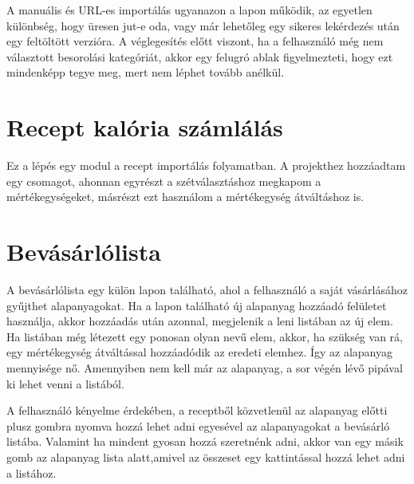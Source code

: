 \documentclass[12pt]{report}
\theoremstyle{definition}
\begin{document}
A manuális és URL-es importálás ugyanazon a lapon működik, az egyetlen különbség, hogy üresen jut-e oda, vagy már lehetőleg egy sikeres lekérdezés után egy feltöltött verzióra. A véglegesítés előtt viszont, ha a felhasználó még nem választott besorolási kategóriát, akkor egy felugró ablak figyelmezteti, hogy ezt mindenképp tegye meg, mert nem léphet tovább anélkül.

\section{Recept kalória számlálás}
Ez a lépés egy modul a recept importálás folyamatban. A projekthez hozzáadtam egy csomagot, ahonnan egyrészt a szétválasztáshoz megkapom a mértékegységeket, másrészt ezt használom a mértékegység átváltáshoz is.

	{\color{red}{
			A tápanyag információkat egy külső adatbázisból szedem, ami /*offline */ és a Food Data Central API ameriaki állami adatbázis rendszert használtam. A használati feltételeket végigolvasva kiderült, hogy bárki ingyen használhatja, akár a jogok feltüntetése nélkül is, bár megköszönik, amennyiben az megtörténne.
		}}

	{\color{red}{
			A kalóriaszámlálás kizárólag akkor fut le, ha a receptlekérdezés során nem létezett az eredeti oldalon a kalória információ, vagy ha a recept manuálisan lett létrehozva. Ahhoz, hogy megfelelő eredményt kapjunk, ha az alapanyagokból nem tudunk legalább 80 százalékból tápanyag adatot megkapni, akkor nem lesz megjelenítve kalória információ a recepthez. Amennyiben megfelelő mennyiségű adatunk van, a korábban említett mértékegység átváltásokkal egységesítem az alapanyagokat a tápanyag táblázat alap értékéhez, aztán azt összeadva kapjuk a kalória adatot a recepthez.
		}}

\section{Bevásárlólista}
A bevásárlólista egy külön lapon található, ahol a felhasználó a saját vásárlásához gyűjthet alapanyagokat. Ha a lapon található új alapanyag hozzáadó felületet használja, akkor hozzáadás után azonnal, megjelenik a leni listában az új elem. Ha  listában még létezett egy ponosan olyan nevű elem, akkor, ha szükség van rá, egy mértékegység átváltással hozzáadódik az eredeti elemhez. Így az alapanyag mennyisége nő. Amennyiben nem kell már az alapanyag, a sor végén lévő pipával ki lehet venni a listából.

A felhasználó kényelme érdekében, a receptből közvetlenül az alapanyag előtti plusz gombra nyomva hozzá lehet adni egyesével az alapanyagokat a bevásárló listába. Valamint ha mindent gyosan hozzá szeretnénk adni, akkor van egy másik gomb az alapanyag lista alatt,amivel az összeset egy kattintással hozzá lehet adni a listához.
\end{document}
